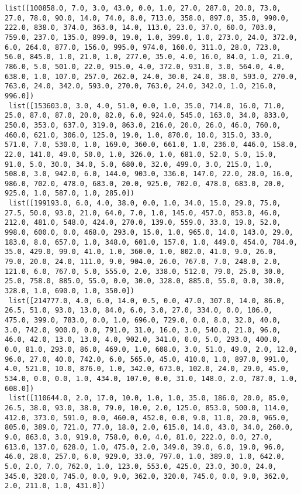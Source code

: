 \documentclass[11pt]{article}
\begin{document}
\begin{Verbatim}[commandchars=\\\{\}]
 list([100858.0, 7.0, 3.0, 43.0, 0.0, 1.0, 27.0, 287.0, 20.0, 73.0, 27.0, 78.0, 90.0, 14.0, 74.0, 8.0, 713.0, 358.0, 897.0, 35.0, 990.0, 222.0, 838.0, 374.0, 363.0, 14.0, 113.0, 23.0, 37.0, 60.0, 703.0, 759.0, 237.0, 135.0, 899.0, 19.0, 1.0, 399.0, 1.0, 273.0, 24.0, 372.0, 6.0, 264.0, 877.0, 156.0, 995.0, 974.0, 160.0, 311.0, 28.0, 723.0, 56.0, 845.0, 1.0, 21.0, 1.0, 277.0, 35.0, 4.0, 16.0, 84.0, 1.0, 21.0, 786.0, 5.0, 501.0, 22.0, 915.0, 4.0, 372.0, 931.0, 3.0, 564.0, 4.0, 638.0, 1.0, 107.0, 257.0, 262.0, 24.0, 30.0, 24.0, 38.0, 593.0, 270.0, 763.0, 24.0, 342.0, 593.0, 270.0, 763.0, 24.0, 342.0, 1.0, 216.0, 996.0])
 list([153603.0, 3.0, 4.0, 51.0, 0.0, 1.0, 35.0, 714.0, 16.0, 71.0, 25.0, 87.0, 87.0, 20.0, 82.0, 6.0, 924.0, 545.0, 163.0, 34.0, 833.0, 250.0, 353.0, 637.0, 319.0, 863.0, 216.0, 20.0, 26.0, 46.0, 760.0, 460.0, 621.0, 306.0, 125.0, 19.0, 1.0, 870.0, 10.0, 315.0, 33.0, 571.0, 7.0, 530.0, 1.0, 169.0, 360.0, 661.0, 1.0, 236.0, 446.0, 158.0, 22.0, 141.0, 49.0, 50.0, 1.0, 326.0, 1.0, 681.0, 52.0, 5.0, 15.0, 91.0, 5.0, 30.0, 34.0, 5.0, 680.0, 32.0, 499.0, 3.0, 215.0, 1.0, 508.0, 3.0, 942.0, 6.0, 144.0, 903.0, 336.0, 147.0, 22.0, 28.0, 16.0, 986.0, 702.0, 478.0, 683.0, 20.0, 925.0, 702.0, 478.0, 683.0, 20.0, 925.0, 1.0, 587.0, 1.0, 285.0])
 list([199193.0, 6.0, 4.0, 38.0, 0.0, 1.0, 34.0, 15.0, 29.0, 75.0, 27.5, 50.0, 93.0, 21.0, 64.0, 7.0, 1.0, 145.0, 457.0, 853.0, 46.0, 212.0, 481.0, 548.0, 424.0, 270.0, 139.0, 559.0, 33.0, 19.0, 52.0, 998.0, 600.0, 0.0, 468.0, 293.0, 15.0, 1.0, 965.0, 14.0, 143.0, 29.0, 183.0, 8.0, 657.0, 1.0, 348.0, 601.0, 157.0, 1.0, 449.0, 454.0, 784.0, 35.0, 429.0, 99.0, 41.0, 1.0, 360.0, 1.0, 802.0, 41.0, 9.0, 26.0, 79.0, 20.0, 24.0, 111.0, 9.0, 904.0, 26.0, 767.0, 7.0, 248.0, 2.0, 121.0, 6.0, 767.0, 5.0, 555.0, 2.0, 338.0, 512.0, 79.0, 25.0, 30.0, 25.0, 758.0, 885.0, 55.0, 0.0, 30.0, 328.0, 885.0, 55.0, 0.0, 30.0, 328.0, 1.0, 690.0, 1.0, 350.0])
 list([214777.0, 4.0, 6.0, 14.0, 0.5, 0.0, 47.0, 307.0, 14.0, 86.0, 26.5, 51.0, 93.0, 13.0, 84.0, 6.0, 3.0, 27.0, 334.0, 0.0, 106.0, 475.0, 399.0, 783.0, 0.0, 1.0, 696.0, 729.0, 0.0, 8.0, 32.0, 40.0, 3.0, 742.0, 900.0, 0.0, 791.0, 31.0, 16.0, 3.0, 540.0, 21.0, 96.0, 46.0, 42.0, 13.0, 13.0, 4.0, 902.0, 341.0, 0.0, 5.0, 293.0, 400.0, 0.0, 81.0, 293.0, 86.0, 469.0, 1.0, 608.0, 3.0, 51.0, 49.0, 2.0, 12.0, 96.0, 27.0, 40.0, 742.0, 6.0, 565.0, 45.0, 410.0, 1.0, 897.0, 991.0, 4.0, 521.0, 10.0, 876.0, 1.0, 342.0, 673.0, 102.0, 24.0, 29.0, 45.0, 534.0, 0.0, 0.0, 1.0, 434.0, 107.0, 0.0, 31.0, 148.0, 2.0, 787.0, 1.0, 608.0])
 list([110644.0, 2.0, 17.0, 10.0, 1.0, 1.0, 35.0, 186.0, 20.0, 85.0, 26.5, 38.0, 93.0, 38.0, 79.0, 10.0, 2.0, 125.0, 853.0, 500.0, 114.0, 412.0, 373.0, 591.0, 0.0, 460.0, 452.0, 0.0, 9.0, 11.0, 20.0, 965.0, 805.0, 389.0, 721.0, 77.0, 18.0, 2.0, 615.0, 14.0, 43.0, 34.0, 260.0, 9.0, 863.0, 3.0, 919.0, 758.0, 0.0, 4.0, 81.0, 222.0, 0.0, 27.0, 613.0, 137.0, 628.0, 1.0, 475.0, 2.0, 349.0, 39.0, 6.0, 19.0, 96.0, 46.0, 28.0, 257.0, 6.0, 929.0, 33.0, 797.0, 1.0, 389.0, 1.0, 642.0, 5.0, 2.0, 7.0, 762.0, 1.0, 123.0, 553.0, 425.0, 23.0, 30.0, 24.0, 345.0, 320.0, 745.0, 0.0, 9.0, 362.0, 320.0, 745.0, 0.0, 9.0, 362.0, 2.0, 211.0, 1.0, 431.0])

\end{Verbatim}
\end{document}
